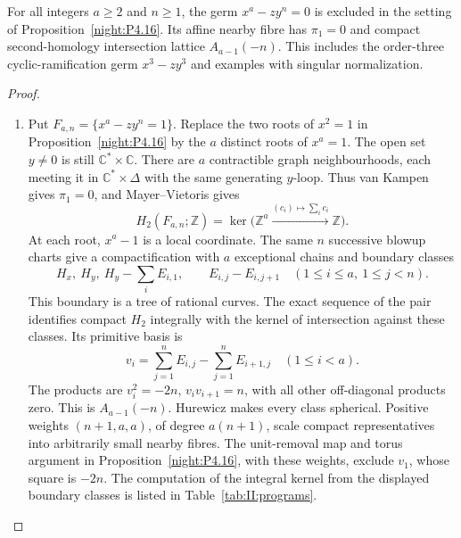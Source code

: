 \begin{proposition}[The lattice of $x^a-zy^n=1$]\hypertarget{tag-02WO}{}\label{night:P4.17}\label{stmt:P4.17}

For all integers $a\geq2$ and $n\geq1$, the germ $x^a-zy^n=0$ is
excluded in the setting of Proposition~\ref{night:P4.16}. Its affine nearby fibre has
$\pi_1=0$ and compact second-homology intersection lattice
$A_{a-1}(-n)$. This includes the order-three cyclic-ramification
germ $x^3-zy^3$ and examples with singular normalization.
\end{proposition}
\begin{proof}

\begin{enumerate}[label={$\langle1\rangle$\arabic*.},leftmargin=*]
\item Put $F_{a,n}=\{x^a-zy^n=1\}$. Replace the two roots of
$x^2=1$ in Proposition~\ref{night:P4.16} by the $a$ distinct
roots of $x^a=1$. The open set $y\ne0$ is still
$\mathbb C^*\times\mathbb C$. There are $a$ contractible graph
neighbourhoods, each meeting it in $\mathbb C^*\times\Delta$
with the same generating $y$-loop. Thus van Kampen gives
$\pi_1=0$, and Mayer--Vietoris gives
\[
 H_2(F_{a,n};\mathbb Z)=\ker\bigl(\mathbb Z^a
   \xrightarrow{(c_i)\mapsto\sum_i c_i}\mathbb Z\bigr).
\]
At each root, $x^a-1$ is a local coordinate. The same $n$
successive blowup charts give a compactification with $a$
exceptional chains and boundary classes
\[
 H_x,\ H_y,\ H_y-\sum_i E_{i,1},\qquad
 E_{i,j}-E_{i,j+1}\quad(1\leq i\leq a,\ 1\leq j<n).
\]
This boundary is a tree of rational curves. The exact sequence
of the pair identifies compact $H_2$ integrally with the kernel
of intersection against these classes. Its primitive basis is
\[
 v_i=\sum_{j=1}^n E_{i,j}-\sum_{j=1}^n E_{i+1,j}
       \quad(1\leq i<a).
\]
The products are $v_i^2=-2n$, $v_iv_{i+1}=n$, with all other
off-diagonal products zero. This is $A_{a-1}(-n)$.
Hurewicz makes every class spherical. Positive weights
$(n+1,a,a)$, of degree $a(n+1)$, scale compact representatives
into arbitrarily small nearby fibres. The unit-removal map and torus argument in
Proposition~\ref{night:P4.16}, with these weights, exclude $v_1$,
whose square is $-2n$. The computation of the integral kernel
from the displayed boundary classes is listed in
Table~\ref{tab:II:programs}.


\end{enumerate}
\end{proof}
